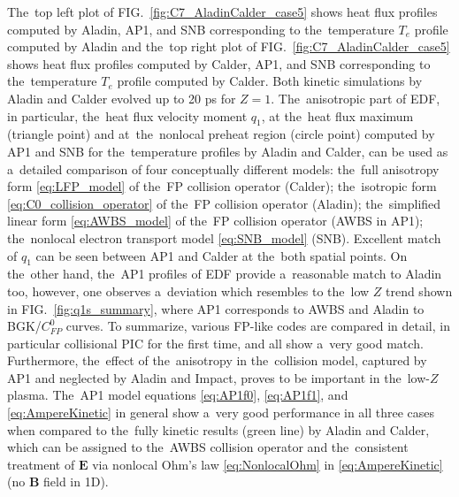 \documentclass[
 aps,
 jmp,
 amsmath,amssymb,
 twocolumn,
]{revtex4-1}
\newcommand{\figref}[1]{FIG.~\ref{#1}}
\newcommand{\vect}[1]{\boldsymbol{#1}}
\newcommand{\Zbar}{Z}
\newcommand{\E}{\vect{E}}
\newcommand{\B}{\vect{B}}
\newcommand{\Te}{T_e}
\newcommand{\corrMH}[1]{ {\color{red} #1} }
\begin{document}
The~top left plot of \figref{fig:C7_AladinCalder_case5} shows heat flux 
profiles computed by Aladin, AP1, and SNB corresponding to the~temperature 
$\Te$ profile computed by Aladin and the~top right plot of 
\figref{fig:C7_AladinCalder_case5} shows heat flux profiles computed by Calder, 
AP1, and SNB corresponding to the~temperature $\Te$ profile computed by Calder.
Both kinetic simulations by Aladin and Calder evolved up to 20 ps for 
$\Zbar = 1$. 
The~anisotropic part of EDF, in particular, 
the~heat flux velocity moment $q_1$, 
at the~heat flux maximum (triangle point) and at~the~nonlocal preheat region 
(circle point) computed by AP1 and SNB for the~temperature profiles by 
Aladin and Calder, can be used as a~detailed comparison of four conceptually
different models: the~full anisotropy form \eqref{eq:LFP_model} of 
the~FP collision operator (Calder); the~isotropic form 
\eqref{eq:C0_collision_operator} of the~FP collision operator (Aladin);
the~simplified linear form \eqref{eq:AWBS_model} of the~FP collision operator
(AWBS in AP1); 
the~nonlocal electron transport model \eqref{eq:SNB_model} (SNB). 
Excellent match of $q_1$ can be seen between 
AP1 and Calder at the~both spatial points. On the~other hand, 
the~AP1 profiles of EDF provide a~reasonable match to Aladin too, however,
one observes a~deviation
which resembles to the~low $\Zbar$ trend shown in \figref{fig:q1s_summary}, 
where AP1 corresponds to AWBS and Aladin to BGK/$C^0_{FP}$ curves. 
\corrMH{
To summarize,
various FP-like codes are compared in detail, in particular collisional PIC 
for the first time, and all show a~very good match. 
Furthermore, the~effect of the~anisotropy in the~collision model, 
captured by AP1 and neglected by Aladin and Impact, proves to be important
in the~low-$\Zbar$ plasma. 
The~AP1 model equations \eqref{eq:AP1f0}, \eqref{eq:AP1f1}, 
and \eqref{eq:AmpereKinetic} in general show a~very good performance 
in all three cases when compared to the~fully kinetic results 
(green line) by Aladin and Calder, which can be assigned 
to the~AWBS collision operator and the~consistent 
treatment of $\E$ via nonlocal Ohm's law \eqref{eq:NonlocalOhm} in
 \eqref{eq:AmpereKinetic} (no $\B$ field in 1D).
}

 %
\end{document}

